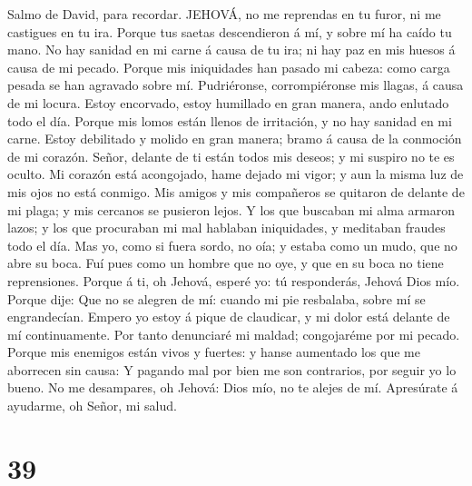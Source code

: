  Salmo de David, para recordar. JEHOVÁ, no me reprendas en
tu furor, ni me castigues en tu ira.  Porque tus saetas
descendieron á mí, y sobre mí ha caído tu mano.  No hay
sanidad en mi carne á causa de tu ira; ni hay paz en mis huesos á causa
de mi pecado.  Porque mis iniquidades han pasado mi cabeza:
como carga pesada se han agravado sobre mí.  Pudriéronse,
corrompiéronse mis llagas, á causa de mi locura.  Estoy
encorvado, estoy humillado en gran manera, ando enlutado todo el día.
 Porque mis lomos están llenos de irritación, y no hay
sanidad en mi carne.  Estoy debilitado y molido en gran
manera; bramo á causa de la conmoción de mi corazón.  Señor,
delante de ti están todos mis deseos; y mi suspiro no te es oculto.
 Mi corazón está acongojado, hame dejado mi vigor; y aun la
misma luz de mis ojos no está conmigo.  Mis amigos y mis
compañeros se quitaron de delante de mi plaga; y mis cercanos se
pusieron lejos.  Y los que buscaban mi alma armaron lazos;
y los que procuraban mi mal hablaban iniquidades, y meditaban fraudes
todo el día.  Mas yo, como si fuera sordo, no oía; y estaba
como un mudo, que no abre su boca.  Fuí pues como un hombre
que no oye, y que en su boca no tiene reprensiones.  Porque
á ti, oh Jehová, esperé yo: tú responderás, Jehová Dios mío.
 Porque dije: Que no se alegren de mí: cuando mi pie
resbalaba, sobre mí se engrandecían.  Empero yo estoy á
pique de claudicar, y mi dolor está delante de mí continuamente.
 Por tanto denunciaré mi maldad; congojaréme por mi pecado.
 Porque mis enemigos están vivos y fuertes: y hanse
aumentado los que me aborrecen sin causa:  Y pagando mal
por bien me son contrarios, por seguir yo lo bueno.  No me
desampares, oh Jehová: Dios mío, no te alejes de mí. 
Apresúrate á ayudarme, oh Señor, mi salud.

\hypertarget{section-38}{%
\section{39}\label{section-38}}

